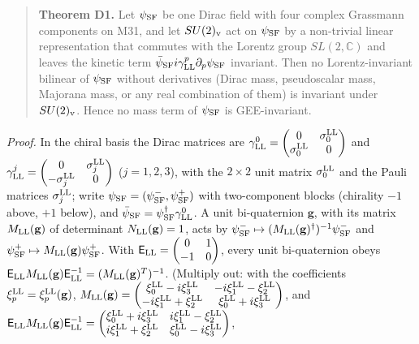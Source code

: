 \documentclass[
  10pt,
]{article}
\begin{document}
\begin{quote}
\textbf{Theorem D1.} Let \(\psi_{\rm SF}\) be one Dirac field with four
complex Grassmann components on M31, and let \(SU(2)_{\rm v}\) act on
\(\psi_{\rm SF}\) by a non-trivial linear representation that commutes
with the Lorentz group \(SL(2,\mathbb C)\) and leaves the kinetic term
\(\bar\psi_{\rm SF}i\gamma^p_{\rm LL}\partial_p\psi_{\rm SF}\)
invariant. Then no Lorentz-invariant bilinear of \(\psi_{\rm SF}\)
without derivatives (Dirac mass, pseudoscalar mass, Majorana mass, or
any real combination of them) is invariant under \(SU(2)_{\rm v}\).
Hence no mass term of \(\psi_{\rm SF}\) is GEE-invariant.
\end{quote}

\emph{Proof.} In the chiral basis the Dirac matrices are
\(\gamma^0_{\rm LL}=\begin{pmatrix}0&\sigma^{\rm LL}_0\\\sigma^{\rm LL}_0&0\end{pmatrix}\)
and
\(\gamma^j_{\rm LL}=\begin{pmatrix}0&\sigma^{\rm LL}_j\\-\sigma^{\rm LL}_j&0\end{pmatrix}\)
(\(j=1,2,3\)), with the \(2\times2\) unit matrix \(\sigma^{\rm LL}_0\)
and the Pauli matrices \(\sigma^{\rm LL}_j\); write
\(\psi_{\rm SF}=(\psi^-_{\rm SF},\psi^+_{\rm SF})\) with two-component
blocks (chirality \(-1\) above, \(+1\) below), and
\(\bar\psi_{\rm SF}=\psi_{\rm SF}^\dagger\gamma^0_{\rm LL}\). A unit
bi-quaternion \(\mathbf g\), with its matrix \(M_{\rm LL}(\mathbf g)\)
of determinant \(N_{\rm LL}(\mathbf g)=1\), acts by
\(\psi^-_{\rm SF}\mapsto(M_{\rm LL}(\mathbf g)^\dagger)^{-1}\psi^-_{\rm SF}\)
and \(\psi^+_{\rm SF}\mapsto M_{\rm LL}(\mathbf g)\psi^+_{\rm SF}\).
With \(\mathsf E_{\rm LL}=\begin{pmatrix}0&1\\-1&0\end{pmatrix}\), every
unit bi-quaternion obeys
\(\mathsf E_{\rm LL}M_{\rm LL}(\mathbf g)\mathsf E_{\rm LL}^{-1}=(M_{\rm LL}(\mathbf g)^T)^{-1}\).
(Multiply out: with the coefficients
\(\xi^{\rm LL}_p=\xi^{\rm LL}_p(\mathbf g)\),
\(M_{\rm LL}(\mathbf g)=\begin{pmatrix}\xi^{\rm LL}_0-i\xi^{\rm LL}_3&-i\xi^{\rm LL}_1-\xi^{\rm LL}_2\\-i\xi^{\rm LL}_1+\xi^{\rm LL}_2&\xi^{\rm LL}_0+i\xi^{\rm LL}_3\end{pmatrix}\),
and
\(\mathsf E_{\rm LL}M_{\rm LL}(\mathbf g)\mathsf E_{\rm LL}^{-1}=\begin{pmatrix}\xi^{\rm LL}_0+i\xi^{\rm LL}_3&i\xi^{\rm LL}_1-\xi^{\rm LL}_2\\i\xi^{\rm LL}_1+\xi^{\rm LL}_2&\xi^{\rm LL}_0-i\xi^{\rm LL}_3\end{pmatrix}\),
\end{document}

